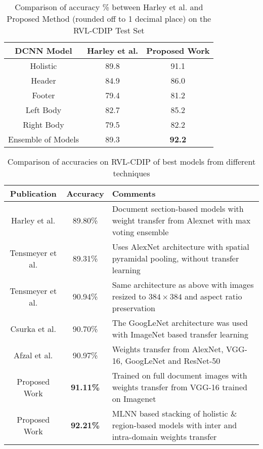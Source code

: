\documentclass[10pt,conference,a4paper]{IEEEtran}
\begin{document}
\begin{table}[]
	\centering
	\caption{Comparison of accuracy \% between Harley et al. and Proposed Method (rounded off to 1 decimal place) on the RVL-CDIP Test Set}
	\label{Tab:RegionAccs}
	\begin{tabular}{|c|c|c|}
		\hline
		\textbf{DCNN Model} & \textbf{Harley et al.} & \textbf{Proposed Work} \\
		\hline \hline
		Holistic            & 89.8                   & 91.1                  \\
		Header              & 84.9                   & 86.0                  \\
		Footer              & 79.4                   & 81.2                  \\
		Left Body           & 82.7                   & 85.2                  \\
		Right Body          & 79.5                   & 82.2                  \\
		\hline
		Ensemble of Models  & 89.3                   & \textbf{92.2} \\
		\hline
	\end{tabular}
\end{table}


\begin{table}[]
	\centering
	\caption{Comparison of accuracies on RVL-CDIP of best models from different techniques}
	\label{Tab:FinalComp}
	\begin{tabularx}{\columnwidth}{|c|c|m{}|}
		\hline
		\textbf{Publication} & \textbf{Accuracy} & \textbf{\hspace{0.16\columnwidth}Comments}\\
		\hline \hline
		Harley et al.\cite{harley2015evaluation}        & 89.80\%            & {Document section-based models with weight transfer from Alexnet with max voting ensemble \centering}\\
		\hline
		Tensmeyer et al.\cite{tensmeyer2017analysis}     & 89.31\%           & Uses AlexNet architecture with spatial pyramidal pooling, without transfer learning\\
		\hline		
		Tensmeyer et al.\cite{tensmeyer2017analysis}    & 90.94\%           & Same architecture as above with images resized to $384\times 384$ and aspect ratio preservation\\
		\hline
		Csurka et al. \cite{csurka2016right}        & 90.70\%           & The GoogLeNet architecture was used with ImageNet based transfer learning\\
		\hline
		Afzal et al. \cite{afzal2017cutting}        & 90.97\%           & Weights transfer from AlexNet, VGG-16, GoogLeNet and ResNet-50\\
		\hline		
		Proposed Work         & \textbf{91.11\%}           & Trained on full document images with weights transfer from VGG-16 trained on Imagenet\\
		\hline
		Proposed Work         & \textbf{92.21\%}           & MLNN based stacking of holistic \& region-based models with inter and intra-domain weights transfer\\
		\hline
	\end{tabularx}
\end{table}
\end{document}
